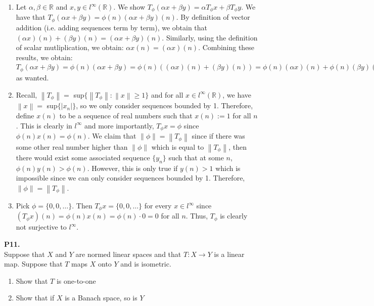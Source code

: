 \documentclass{article}
\newcommand{\norm}[1]{\left\lVert#1\right\rVert}
\begin{document}
    \begin{enumerate}
        \item Let $\alpha,\beta\in\mathbb{R}$ and $x,y\in l^{\infty}(\mathbb{R})$. We show $T_{\phi}(\alpha x+\beta y)=
            \alpha T_{\phi}x+\beta T_{\phi}y$. 
            We have that $T_{\phi}(\alpha x + \beta y) = \phi(n) (\alpha x + \beta y)(n)$. By definition
            of vector addition (i.e. adding sequences term by term), we obtain that $(\alpha x)(n) + (\beta y)(n) 
            = (\alpha x+\beta y)(n)$. Similarly, using the definition of scalar mutliplication, we obtain: $\alpha x(n) = (\alpha x)(n)$.
            Combining these results, we obtain: $T_{\phi}(\alpha x + \beta y) = \phi(n)(\alpha x + \beta y) = \phi(n)((\alpha x)(n) +
            (\beta y)(n)) = \phi(n)(\alpha x)(n) + \phi(n)(\beta y)(n) = \alpha\phi(n) x(n) + \beta\phi(n) y(n) = \alpha(T_{\phi}x)(n)
            + \beta(T_{\phi}y)(n)$ as wanted.
        \item Recall, $\norm{T_{\phi}} =$ sup$\{\norm{T_{\phi}}: \norm{x}\geq 1\}$ and for all $x\in l^{\infty}(\mathbb{R})$, we have
            $\norm{x} =$ sup$\{|x_n|\}$, so we only consider sequences bounded by 1. Therefore, define $x(n)$ to be a sequence
            of real numbers such that $x(n) := 1$ for all $n$. This is clearly in $l^{\infty}$ and more importantly,
            $T_{\phi}x = \phi$ since $\phi(n)x(n) = \phi(n)$. We claim that $\norm{\phi} = \norm{T_{\phi}}$ since if there was
            some other real number higher than $\norm{\phi}$ which is equal to $\norm{T_{\phi}}$, then there would exist some
            associated sequence $\{y_n\}$ such that at some $n$, $\phi(n)y(n) > \phi(n)$. However, this is only true if $y(n)>1$
            which is impossible since we can only consider sequences bounded by 1. Therefore, $\norm{\phi} = \norm{T_{\phi}}$.
        \item Pick $\phi = \{0,0,\hdots\}$. Then $T_{\phi}x = \{0,0,\hdots\}$ for every $x\in l^{\infty}$ since $(T_{\phi}x)(n) = 
            \phi(n)x(n) = \phi(n)\cdot 0 = 0$ for all $n$. Thus, $T_{\phi}$ is clearly not surjective to $l^{\infty}$.
    \end{enumerate}

    \textbf{P11.}\\

    Suppose that $X$ and $Y$ are normed linear spaces and that $T: X\to Y$ is a linear map. Suppose that $T$ maps $X$ onto $Y$
    and is isometric.
    \begin{enumerate}
        \item Show that $T$ is one-to-one
        \item Show that if $X$ is a Banach space, so is $Y$
    \end{enumerate}
\end{document}
